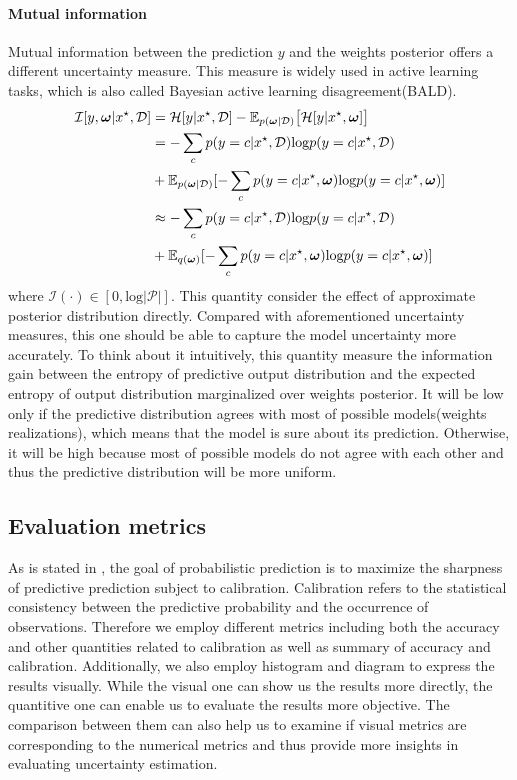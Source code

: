 \paragraph{Mutual information}
Mutual information between the prediction $y$ and the weights posterior offers a different uncertainty measure. This measure is widely used in active learning tasks\cite{houlsby2011bayesian}, which is also called Bayesian active learning disagreement(BALD).
\begin{equation}\label{mi}	
\begin{aligned}
\mathcal I[y,\boldsymbol \omega|x^\star, \mathcal D] &= \mathcal H[y|x^\star, \mathcal D] - \mathbb E_{p(\boldsymbol \omega| \mathcal D)}\big[\mathcal H[y|x^\star, \boldsymbol \omega] \big] \\
&= -\sum_{c}p(y=c|x^\star, \mathcal D)\text{log}p(y=c|x^\star, \mathcal D) \\ &+ \mathbb E_{p(\boldsymbol \omega|\mathcal D)}[-\sum_{c}p(y=c|x^\star, \boldsymbol \omega)\text{log}p(y=c|x^\star, \boldsymbol \omega)] \\
&\approx -\sum_{c}p(y=c|x^\star, \mathcal D)\text{log}p(y=c|x^\star, \mathcal D) \\ &+ \mathbb E_{q(\boldsymbol \omega)}[-\sum_{c}p(y=c|x^\star, \boldsymbol \omega)\text{log}p(y=c|x^\star, \boldsymbol \omega)]
\end{aligned}
\end{equation}
where $\mathcal I(\cdot) \in [0,\text{log}{|\mathcal P|}]$.
This quantity consider the effect of approximate posterior distribution directly. Compared with aforementioned uncertainty measures, this one should be able to capture the model uncertainty more accurately. To think about it intuitively, this quantity measure the information gain between the entropy of predictive output distribution and the expected entropy of output distribution marginalized over weights posterior. It will be low only if the predictive distribution agrees with most of possible models(weights realizations), which means that the model is sure about its prediction. Otherwise, it will be high because most of possible models do not agree with each other and thus the predictive distribution will be more uniform.

\subsection{Evaluation metrics}
As is stated in \cite{gneiting2007probabilistic}, the goal of probabilistic prediction is to maximize the sharpness of predictive prediction subject to calibration. Calibration refers to the statistical consistency between the predictive probability and the occurrence of observations. Therefore we employ different metrics including both the accuracy and other quantities related to calibration as well as summary of accuracy and calibration. Additionally, we also employ histogram and diagram to express the results visually. While the visual one can show us the results more directly, the quantitive one can enable us to evaluate the results more objective. The comparison between them can also help us to examine if visual metrics are corresponding to the numerical metrics and thus provide more insights in evaluating uncertainty estimation. 

